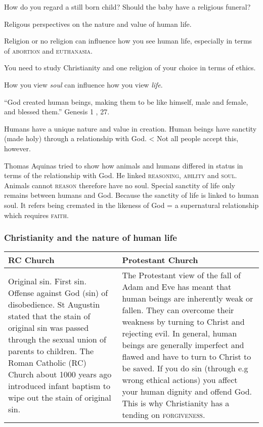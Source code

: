 \documentclass{article}
\begin{document}

How do you regard a still born child?
Should the baby have a religious funeral?

Religous perspectives on the nature and value of human life.

Religion or no religion can influence how you see human life, especially in terms of \textsc{abortion} and \textsc{euthanasia}.

You need to study Christianity and one religion of your choice in terms of ethics.

How you view \textsl{soul} can influence how you view \textsl{life}.

``God created human beings, making them to be like himself, male and female, and blessed them.'' Genesis 1 ,  27.

Humans have a unique nature and value in creation.  Human beings have sanctity (made holy) through a relationship with God.  < Not all people accept this, however.

Thomas Aquinas tried to show how animals and humans differed in status in terms of the relationship with God.  He linked \textsc{reasoning}, \textsc{ability} and \textsc{soul}.  Animals cannot \textsc{reason} therefore have no soul.  Special sanctity of life only remains between humans and God.  Because the sanctity of life is linked to human soul.  It refers being cremated in the likeness of God = a supernatural relationship which requires \textsc{faith}.

\subsubsection*{Christianity and the nature of human life}

\begin{tabular}{ | p{5cm} | p{5cm} | }
\hline
RC Church & Protestant Church\\ \hline
Original sin.  First sin.  Offense against God (sin) of disobedience.  St Augustin stated that the stain of original sin was passed through the sexual union of parents to children.  The Roman Catholic (RC) Church about 1000 years ago introduced infant baptism to wipe out the stain of original sin. & The Protestant view of the fall of Adam and Eve has meant that human beings are inherently weak or fallen.  They can overcome their weakness by turning to Christ and rejecting evil.  In general, human beings are generally imperfect and flawed and have to turn to Christ to be saved.  If you do sin (through e.g wrong ethical actions) you affect your human dignity and offend God.  This is why Christianity has a tending on \textsc{forgiveness}.\\ \hline
\end{tabular}
\end{document}
